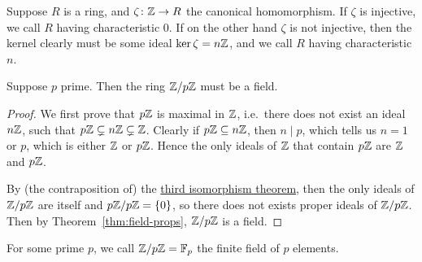 \begin{definition}
    Suppose \(R\) is a ring,
    and \(\zeta\colon\mathbb{Z}\to R\) the canonical homomorphism.
    If \(\zeta\) is injective, %
    we call \(R\) having characteristic 0.
    If on the other hand \(\zeta\) is not injective,
    then the kernel clearly must be some ideal \(\ker\zeta = n\mathbb{Z}\),
    and we call \(R\) having characteristic \(n\).
\end{definition}
\begin{proposition}
    Suppose \(p\) prime.
    Then the ring \(\mathbb{Z}/p\mathbb{Z}\) must be a field.
\end{proposition}
\begin{proof}
    We first prove that \(p\mathbb{Z}\) is maximal in \(\mathbb{Z}\),
    i.e.\ there does not exist an ideal \(n\mathbb{Z}\),
    such that \(p\mathbb{Z} \subsetneq n\mathbb{Z} \subsetneq \mathbb{Z}\).
    Clearly if \(p\mathbb{Z} \subseteq n\mathbb{Z}\),
    then \(n \mid p\), which tells us \(n = 1\) or \(p\),
    which is either \(\mathbb{Z}\) or \(p\mathbb{Z}\).
    Hence the only ideals of \(\mathbb{Z}\) that contain \(p\mathbb{Z}\)
    are \(\mathbb{Z}\) and \(p\mathbb{Z}\).

    By (the contraposition of)
    the \hyperref[thm:iso-3-ring]{third isomorphism theorem},
    then the only ideals of \(\mathbb{Z}/p\mathbb{Z}\) are itself and \(p\mathbb{Z}/p\mathbb{Z} = \{0\}\),
    so there does not exists proper ideals of \(\mathbb{Z}/p\mathbb{Z}\).
    Then by Theorem~\ref{thm:field-props}, \(\mathbb{Z}/p\mathbb{Z}\) is a field.
\end{proof}
\begin{definition}
    For some prime \(p\),
    we call \(\mathbb{Z}/p\mathbb{Z} = \mathbb{F}_p\)
    the finite field of \(p\) elements.
\end{definition}

